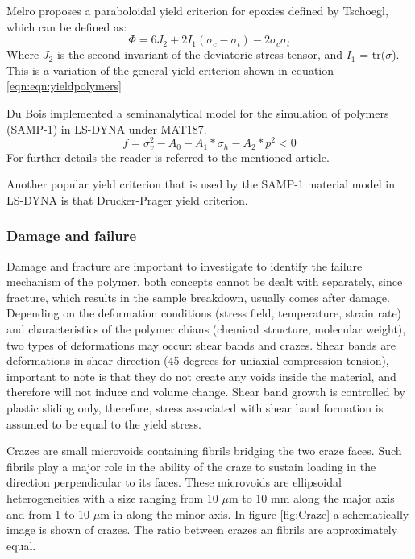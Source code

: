 Melro proposes a paraboloidal yield criterion for epoxies defined by Tschoegl, which can be defined as:
\begin{equation}\label{eqn:yieldpolymers}
\Phi=6J_2+2I_1(\sigma_c-\sigma_t)-2\sigma_c\sigma_t
\end{equation}Where $J_2$ is the second invariant of the deviatoric stress tensor, and $I_1$ = tr(\textbf{$\sigma$}). This is a variation of the general yield criterion shown in equation \ref{eqn:eqn:yieldpolymers}

Du Bois \cite{DuBois2006APolymers} implemented a seminanalytical model for the simulation of polymers (SAMP-1) in LS-DYNA under MAT187. 
\begin{equation}\label{AzziTsai}
f=\sigma_v^2-A_0-A_1*\sigma_h-A_2*p^2<0
\end{equation}For further details the reader is referred to the mentioned article. 

Another popular yield criterion that is used by the SAMP-1 material model in LS-DYNA is that Drucker-Prager yield criterion. 

\subsubsection{Damage and failure}
Damage and fracture are important to investigate to identify the failure mechanism of the polymer, both concepts cannot be dealt with separately, since fracture, which results in the sample breakdown, usually comes after damage. Depending on the deformation conditions (stress field, temperature, strain rate) and characteristics of the polymer chians (chemical structure, molecular weight), two types of deformations may occur: shear bands and crazes. Shear bands are deformations in shear direction (45 degrees for uniaxial compression tension), important to note is that they do not create any voids inside the material, and therefore will not induce and volume change. Shear band growth is controlled by plastic sliding only, therefore, stress associated with shear band formation is assumed to be equal to the yield stress. 

Crazes are small microvoids containing fibrils bridging the two craze faces. Such fibrils play a major role in the ability of the craze to sustain loading in the direction perpendicular to its faces. These microvoids are ellipsoidal heterogeneities with a size ranging from 10 $\mu$m to 10 mm along the major axis and from 1 to 10 $\mu$m in along the minor axis. In figure \ref{fig:Craze} a schematically image is shown of crazes. The ratio between crazes an fibrils are approximately equal.  

